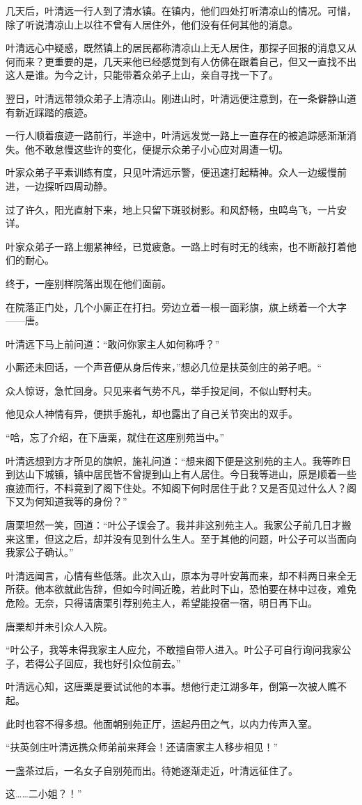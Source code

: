 几天后，叶清远一行人到了清水镇。在镇内，他们四处打听清凉山的情况。可惜，除了听说清凉山上以往不曾有人居住外，他们没有任何其他的消息。

叶清远心中疑惑，既然镇上的居民都称清凉山上无人居住，那探子回报的消息又从何而来？更重要的是，几天来他已经感觉到有人仿佛在跟着自己，但又一直找不出这人是谁。为今之计，只能带着众弟子上山，亲自寻找一下了。

翌日，叶清远带领众弟子上清凉山。刚进山时，叶清远便注意到，在一条僻静山道有新近踩踏的痕迹。

一行人顺着痕迹一路前行，半途中，叶清远发觉一路上一直存在的被追踪感渐渐消失。他不敢怠慢这些许的变化，便提示众弟子小心应对周遭一切。

叶家众弟子平素训练有度，只见叶清远示警，便迅速打起精神。众人一边缓慢前进，一边探听四周动静。

过了许久，阳光直射下来，地上只留下斑驳树影。和风舒畅，虫鸣鸟飞，一片安详。

叶家众弟子一路上绷紧神经，已觉疲惫。一路上时有时无的线索，也不断敲打着他们的耐心。

终于，一座别样院落出现在他们面前。

在院落正门处，几个小厮正在打扫。旁边立着一根一面彩旗，旗上绣着一个大字——唐。

叶清远下马上前问道：“敢问你家主人如何称呼？”

小厮还未回话，一个声音便从身后传来，”想必几位是扶英剑庄的弟子吧。“

众人惊讶，急忙回身。只见来者气势不凡，举手投足间，不似山野村夫。

他见众人神情有异，便拱手施礼，却也露出了自己关节突出的双手。

“哈，忘了介绍，在下唐栗，就住在这座别苑当中。”

叶清远想到方才所见的旗帜，施礼问道：“想来阁下便是这别苑的主人。我等昨日到达山下城镇，镇中居民皆不曾提到山上有人居住。今日我等进山，原是顺着一些痕迹而行，不料竟到了阁下住处。不知阁下何时居住于此？又是否见过什么人？阁下又为何知道我等的身份？”

唐栗坦然一笑，回道：“叶公子误会了。我并非这别苑主人。我家公子前几日才搬来这里，但这之后，却并没有见到什么生人。至于其他的问题，叶公子可以当面向我家公子确认。”

叶清远闻言，心情有些低落。此次入山，原本为寻叶安苒而来，却不料两日来全无所获。他本欲就此告辞，但如今时间近晚，若此时下山，恐怕要在林中过夜，难免危险。无奈，只得请唐栗引荐别苑主人，希望能投宿一宿，明日再下山。

唐栗却并未引众人入院。

“叶公子，我等未得我家主人应允，不敢擅自带人进入。叶公子可自行询问我家公子，若得公子回应，我也好引众位前去。”

叶清远心知，这唐栗是要试试他的本事。想他行走江湖多年，倒第一次被人瞧不起。

此时也容不得多想。他面朝别苑正厅，运起丹田之气，以内力传声入室。

“扶英剑庄叶清远携众师弟前来拜会！还请唐家主人移步相见！”

一盏茶过后，一名女子自别苑而出。待她逐渐走近，叶清远征住了。

这……二小姐？！”